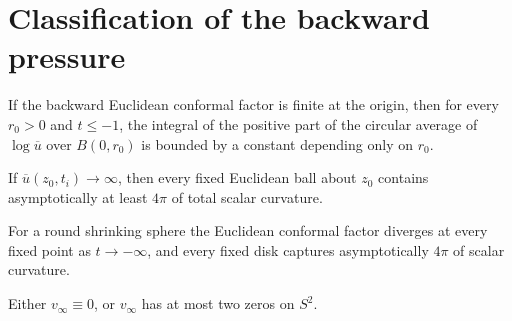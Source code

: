 \section{Classification of the backward pressure}

\begin{lemma}
\label{lem:chow-iv-positive-circular-average-bound}

If the backward Euclidean conformal factor is finite at the origin, then for
every \(r_0>0\) and \(t\le-1\), the integral of the positive part of the
circular average of \(\log\overline u\) over \(B(0,r_0)\) is bounded by a
constant depending only on \(r_0\).
\end{lemma}

\begin{lemma}
\label{lem:chow-iv-unbounded-conformal-factor-curvature-concentration}


If \(\overline u(z_0,t_i)\to\infty\), then every fixed Euclidean ball about
\(z_0\) contains asymptotically at least \(4\pi\) of total scalar curvature.
\end{lemma}

\begin{remark}
\label{rem:chow-iv-round-sphere-curvature-concentration}

For a round shrinking sphere the Euclidean conformal factor diverges at every
fixed point as \(t\to-\infty\), and every fixed disk captures asymptotically
\(4\pi\) of scalar curvature.
\end{remark}

\begin{lemma}
\label{lem:chow-iv-backward-pressure-at-most-two-zeros}


Either \(v_\infty\equiv0\), or \(v_\infty\) has at most two zeros on \(S^2\).
\end{lemma}

